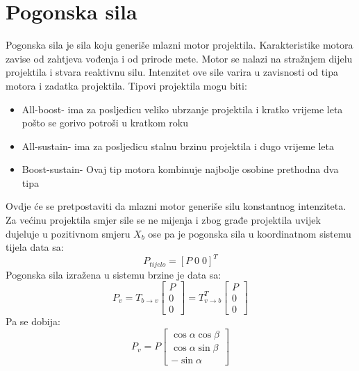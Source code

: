 \section{Pogonska sila}
Pogonska sila je sila koju generiše mlazni motor projektila. Karakteristike motora zavise 
od zahtjeva vođenja i od prirode mete. Motor se nalazi na stražnjem dijelu projektila i stvara reaktivnu 
silu. Intenzitet ove sile varira u zavisnosti od tipa motora i zadatka projektila. Tipovi projektila mogu biti:
\begin{itemize}
    \item All-boost- ima za posljedicu veliko ubrzanje projektila i kratko vrijeme leta pošto se gorivo potroši u kratkom roku
    \item All-sustain- ima za posljedicu stalnu brzinu projektila i dugo vrijeme leta
    \item Boost-sustain- Ovaj tip motora kombinuje najbolje osobine prethodna dva tipa
\end{itemize}
Ovdje će se pretpostaviti da mlazni motor generiše silu konstantnog intenziteta. Za većinu 
projektila smjer sile se ne mijenja i zbog građe projektila uvijek dujeluje u pozitivnom smjeru 
$X_b$ ose pa je pogonska sila u koordinatnom sistemu tijela data sa:
\begin{equation}
    P_{tijelo}=[P\;  0\;  0]^T
\end{equation}
Pogonska sila izražena u sistemu brzine je data sa:
\begin{equation}
    P_v = T_{b\to v}\begin{bmatrix}
        P \\ 0 \\ 0
    \end{bmatrix} = T_{v\to b}^T\begin{bmatrix}
        P \\ 0 \\ 0
    \end{bmatrix}
\end{equation}
Pa se dobija:
\begin{equation}
    P_v=P\begin{bmatrix}
        \cos\alpha\cos\beta \\ \cos\alpha\sin\beta \\ -\sin\alpha
    \end{bmatrix}
\end{equation}
